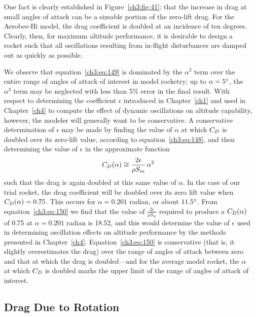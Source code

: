 One fact is clearly established in Figure~\ref{ch3:fig:41}: that the increase in drag at small
angles of attack can be a sizeable portion of the zero-lift drag. For the Aerobee-Hi model, the
drag coefficient is doubled at an incidence of ten degrees. Clearly, then, for maximum altitude
performance, it is desirable to design a rocket such that all oscillations resulting from
in-flight disturbances are damped out as quickly as possible.

We observe that equation~\eqref{ch3:eq:149} is dominated by the $\alpha^2$ term over the entire
range of angles of attack of interest in model rocketry; up to $\alpha = 5^{\circ}$, the $\alpha^3$ term
may be neglected with less than 5\% error in the final result. With respect to determining the
coefficient $\epsilon$ introduced in Chapter~\ref{ch1} and used in Chapter~\ref{ch4} to compute the
effect of dynamic oscillations on altitude capability, however, the modeler will generally want
to be conservative. A conservative determination of $\epsilon$ may be made by finding the value of
$\alpha$ at which $C_{D}$ is doubled over its zero-lift value, according to
equation~\eqref{ch3:eq:148}, and then determining the value of $\epsilon$ in the approximate
function
\begin{equation}\label{ch3:eq:150}
C_{D}(\alpha) \cong \frac{2\epsilon}{\rho S_m}\,\alpha^2
\end{equation}
such that the drag is again doubled at this same value of $\alpha$. In the case of our trial
rocket, the drag coefficient will be doubled over its zero lift value when $C_{D}(\alpha) = 0.75$.
This occurs for $\alpha = 0.201$ radian, or about $11.5^{\circ}$. From equation~\eqref{ch3:eq:150} we
find that the value of $\frac{2\epsilon}{\rho S_m}$ required to produce a $C_{D}(\alpha)$ of 0.75 at
$\alpha = 0.201$ radian is 18.52, and this would determine the value of $\epsilon$ used in
determining oscillation effects on altitude performance by the methods presented in
Chapter~\ref{ch4}. Equation~\eqref{ch3:eq:150} is conservative (that is, it slightly overestimates
the drag) over the range of angles of attack between zero and that at which the drag is
doubled---and for the average model rocket, the $\alpha$ at which $C_{D}$ is doubled marks the upper
limit of the range of angles of attack of interest.

\subsection{Drag Due to Rotation}\label{ch3:sec:5.3}

